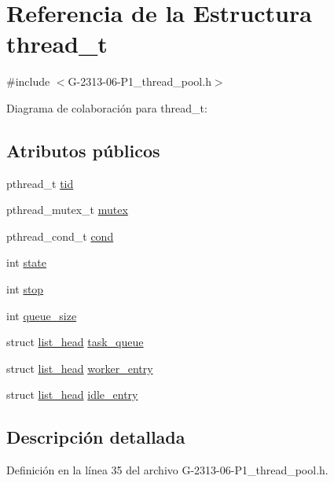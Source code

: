 \hypertarget{structthread__t}{}\section{Referencia de la Estructura thread\+\_\+t}
\label{structthread__t}


{\ttfamily \#include $<$G-\/2313-\/06-\/\+P1\+\_\+thread\+\_\+pool.\+h$>$}



Diagrama de colaboración para thread\+\_\+t\+:
\subsection*{Atributos públicos}
\begin{DoxyCompactItemize}
\item 
pthread\+\_\+t \hyperlink{structthread__t_a92c076d58ca307499452b8dfe0c4e598}{tid}
\item 
pthread\+\_\+mutex\+\_\+t \hyperlink{structthread__t_abb0dcb82ff12b61776b74c76fa27c964}{mutex}
\item 
pthread\+\_\+cond\+\_\+t \hyperlink{structthread__t_a6cb846b84c59d01a8b3a2693d39a4af1}{cond}
\item 
int \hyperlink{structthread__t_a3e0780f1c2fc9932258a60b5043fe424}{state}
\item 
int \hyperlink{structthread__t_a8e9f0fd028676d0ebeef8438f2176bb7}{stop}
\item 
int \hyperlink{structthread__t_aa99eeab6834595bdff5a7da08314fd89}{queue\+\_\+size}
\item 
struct \hyperlink{structlist__head}{list\+\_\+head} \hyperlink{structthread__t_a69c932ede0de60b66a482fb735fca966}{task\+\_\+queue}
\item 
struct \hyperlink{structlist__head}{list\+\_\+head} \hyperlink{structthread__t_a03432229de426c5ba35d0dfa325491f0}{worker\+\_\+entry}
\item 
struct \hyperlink{structlist__head}{list\+\_\+head} \hyperlink{structthread__t_a9386032d478cacdfd680d5691e0eb9d3}{idle\+\_\+entry}
\end{DoxyCompactItemize}


\subsection{Descripción detallada}


Definición en la línea 35 del archivo G-\/2313-\/06-\/\+P1\+\_\+thread\+\_\+pool.\+h.



